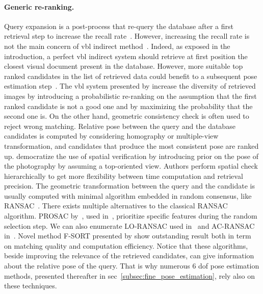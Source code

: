 \paragraph{Generic re-ranking.}
Query expansion is a post-process that re-query the database after a first retrieval step to increase the recall rate~\citep{Chum2007,Chum2011,Tolias2014}. However, increasing the recall rate is not the main concern of \ac{vbl} indirect method~\citep{Sattler2012}. Indeed, as exposed in the introduction, a perfect \ac{vbl} indirect system should retrieve at first position the closest visual document present in the database. However, more suitable top ranked candidates in the list of retrieved data could benefit to a subsequent pose estimation step~\citep{Song2016}. The \ac{vbl} system presented by \citet{Cao2013} increase the diversity of retrieved images by introducing a probabilistic re-ranking on the assumption that the first ranked candidate is not a good one and by maximizing the probability that the second one is.
\label{par:ransac}
On the other hand, geometric consistency check is often used to reject wrong matching. Relative pose between the query and the database candidates is computed by considering homography or multiple-view transformation, and candidates that produce the most consistent pose are ranked up. \citet{Philbin2007} democratize the use of spatial verification by introducing prior on the pose of the photography by assuming a top-oriented view. Authors perform spatial check hierarchically to get more flexibility between time computation and retrieval precision. The geometric transformation between the query and the candidate is usually computed with minimal algorithm embedded in random consensus, like RANSAC~\citep{Fischler1981}. There exists multiple alternatives to the classical RANSAC algorithm. PROSAC by~\citep{Chum2005}, used in~\citep{Donoser2014}, prioritize specific features during the random selection step. We can also enumerate LO-RANSAC used in~\citep{Philbin2007} and AC-RANSAC in~\citep{Qu2015,Qu2016}. Novel method F-SORT presented by \citet{Chan2016} show outstanding result both in term on matching quality and computation efficiency. Notice that these algorithms, beside improving the relevance of the retrieved candidates, can give information about the relative pose of the query. That is why numerous 6 \ac{dof} pose estimation methods, presented thereafter in \acs{sec}~\ref{subsec:fine_pose_estimation}, rely also on these techniques.

